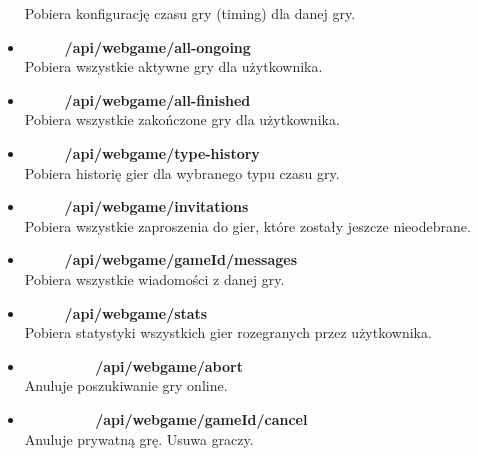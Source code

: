 \documentclass[12pt,a4paper]{article}
\begin{document}
\begin{itemize}
    Pobiera konfigurację czasu gry (timing) dla danej gry. 
    \item \textbf{\colorbox{cyan!90}{\textcolor{white}{GET}} /api/webgame/all-ongoing} \\
    Pobiera wszystkie aktywne gry dla użytkownika. 
    \item \textbf{\colorbox{cyan!90}{\textcolor{white}{GET}} /api/webgame/all-finished} \\
    Pobiera wszystkie zakończone gry dla użytkownika. 
    \item \textbf{\colorbox{cyan!90}{\textcolor{white}{GET}} /api/webgame/type-history} \\
    Pobiera historię gier dla wybranego typu czasu gry. 
    \item \textbf{\colorbox{cyan!90}{\textcolor{white}{GET}} /api/webgame/invitations} \\
    Pobiera wszystkie zaproszenia do gier, które zostały jeszcze nieodebrane. 
    \item \textbf{\colorbox{cyan!90}{\textcolor{white}{GET}} /api/webgame/{gameId}/messages} \\
    Pobiera wszystkie wiadomości z danej gry. 
    \item \textbf{\colorbox{cyan!90}{\textcolor{white}{GET}} /api/webgame/stats} \\
    Pobiera statystyki wszystkich gier rozegranych przez użytkownika. 
    \item \textbf{\colorbox{red!90}{\textcolor{white}{DELETE}} /api/webgame/abort} \\
    Anuluje poszukiwanie gry online. 
    \item \textbf{\colorbox{red!90}{\textcolor{white}{DELETE}} /api/webgame/{gameId}/cancel} \\
    Anuluje prywatną grę. Usuwa graczy. 
\end{itemize}

\newpage
\end{document}
